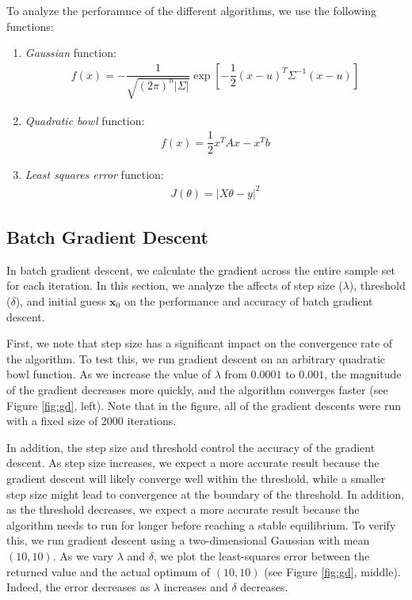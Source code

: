 \documentclass[10pt]{paper}
\begin{document}
To analyze the perforamnce of the different algorithms, we use the following functions:

\begin{enumerate}
\item \emph{Gaussian} function:
\begin{align*}
f(x) = - \dfrac{1}{\sqrt{(2\pi)^n |\Sigma|}} \exp \left[-\dfrac{1}{2} (x - u)^T \Sigma^{-1} (x-u)\right]
\end{align*}
\item \emph{Quadratic bowl} function:
\begin{align*}
f(x) = \dfrac{1}{2} x^T A x - x^T b 
\end{align*}
\item \emph{Least squares error} function:
\begin{align*}
J(\theta) = |X\theta - y|^2
\end{align*}
\end{enumerate}

\subsection{Batch Gradient Descent}

In batch gradient descent, we calculate the gradient across the entire sample set for each iteration. In this section, we analyze the affects of step size ($\lambda$), threshold ($\delta$), and initial guess $\mathbf{x}_{0}$ on the performance and accuracy of batch gradient descent. 

First, we note that step size has a significant impact on the convergence rate of the algorithm. To test this, we run gradient descent on an arbitrary quadratic bowl function. As we increase the value of $\lambda$ from $0.0001$ to $0.001$, the magnitude of the gradient decreases more quickly, and the algorithm converges faster (see Figure \ref{fig:gd}, left). Note that in the figure, all of the gradient descents were run with a fixed size of 2000 iterations.

In addition, the step size and threshold control the accuracy of the gradient descent. As step size increases, we expect a more accurate result because the gradient descent will likely converge well within the threshold, while a smaller step size might lead to convergence at the boundary of the threshold. In addition, as the threshold decreases, we expect a more accurate result because the algorithm needs to run for longer before reaching a stable equilibrium. To verify this, we run gradient descent using a two-dimensional Gaussian with mean $(10, 10)$. As we vary $\lambda$ and $\delta$, we plot the least-squares error between the returned value and the actual optimum of $(10, 10)$ (see Figure \ref{fig:gd}, middle). Indeed, the error decreases as $\lambda$ increases and $\delta$ decreases.
\end{document}
